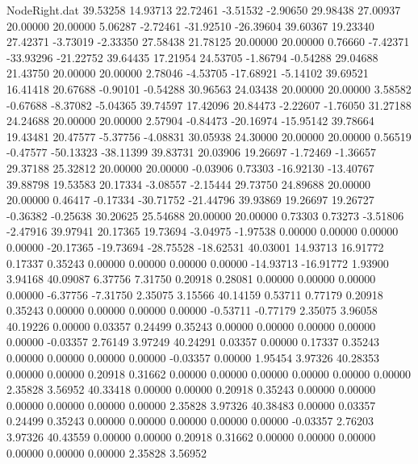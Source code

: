 \begin{filecontents}{NodeRight.dat}
  39.53258   14.93713   22.72461    -3.51532   -2.90650   29.98438   27.00937   20.00000   20.00000    5.06287   -2.72461  -31.92510  -26.39604
  39.60367   19.23340   27.42371    -3.73019   -2.33350   27.58438   21.78125   20.00000   20.00000    0.76660   -7.42371  -33.93296  -21.22752
  39.64435   17.21954   24.53705    -1.86794   -0.54288   29.04688   21.43750   20.00000   20.00000    2.78046   -4.53705  -17.68921   -5.14102
  39.69521   16.41418   20.67688    -0.90101   -0.54288   30.96563   24.03438   20.00000   20.00000    3.58582   -0.67688   -8.37082   -5.04365
  39.74597   17.42096   20.84473    -2.22607   -1.76050   31.27188   24.24688   20.00000   20.00000    2.57904   -0.84473  -20.16974  -15.95142
  39.78664   19.43481   20.47577    -5.37756   -4.08831   30.05938   24.30000   20.00000   20.00000    0.56519   -0.47577  -50.13323  -38.11399
  39.83731   20.03906   19.26697    -1.72469   -1.36657   29.37188   25.32812   20.00000   20.00000   -0.03906    0.73303  -16.92130  -13.40767
  39.88798   19.53583   20.17334    -3.08557   -2.15444   29.73750   24.89688   20.00000   20.00000    0.46417   -0.17334  -30.71752  -21.44796
  39.93869   19.26697   19.26727    -0.36382   -0.25638   30.20625   25.54688   20.00000   20.00000    0.73303    0.73273   -3.51806   -2.47916
  39.97941   20.17365   19.73694    -3.04975   -1.97538    0.00000    0.00000    0.00000    0.00000  -20.17365  -19.73694  -28.75528  -18.62531
  40.03001   14.93713   16.91772     0.17337    0.35243    0.00000    0.00000    0.00000    0.00000  -14.93713  -16.91772    1.93900    3.94168
  40.09087    6.37756    7.31750     0.20918    0.28081    0.00000    0.00000    0.00000    0.00000   -6.37756   -7.31750    2.35075    3.15566
  40.14159    0.53711    0.77179     0.20918    0.35243    0.00000    0.00000    0.00000    0.00000   -0.53711   -0.77179    2.35075    3.96058
  40.19226    0.00000    0.03357     0.24499    0.35243    0.00000    0.00000    0.00000    0.00000    0.00000   -0.03357    2.76149    3.97249
  40.24291    0.03357    0.00000     0.17337    0.35243    0.00000    0.00000    0.00000    0.00000   -0.03357    0.00000    1.95454    3.97326
  40.28353    0.00000    0.00000     0.20918    0.31662    0.00000    0.00000    0.00000    0.00000    0.00000    0.00000    2.35828    3.56952
  40.33418    0.00000    0.00000     0.20918    0.35243    0.00000    0.00000    0.00000    0.00000    0.00000    0.00000    2.35828    3.97326
  40.38483    0.00000    0.03357     0.24499    0.35243    0.00000    0.00000    0.00000    0.00000    0.00000   -0.03357    2.76203    3.97326
  40.43559    0.00000    0.00000     0.20918    0.31662    0.00000    0.00000    0.00000    0.00000    0.00000    0.00000    2.35828    3.56952

\end{filecontents}
